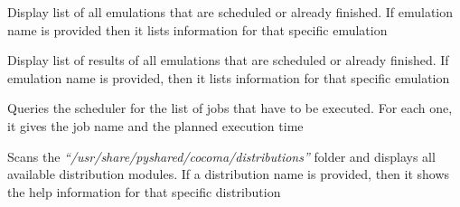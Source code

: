 \documentclass[letterpaper,10pt,english]{sphinxhowto}
\begin{document}
\begin{fulllineitems}
\label{COCOMA/02_how_to_use_it:cmdoption-ccmsh-l}
Display list of all emulations that are scheduled or already finished. If emulation name is provided then it lists information for that specific emulation

\end{fulllineitems}


\begin{fulllineitems}
\label{COCOMA/02_how_to_use_it:cmdoption-ccmsh-r}
Display list of results of all emulations that are scheduled or already finished. If emulation name is provided, then it lists information for that specific emulation

\end{fulllineitems}


\begin{fulllineitems}
\label{COCOMA/02_how_to_use_it:cmdoption-ccmsh-j}
Queries the scheduler for the list of jobs that have to be executed. For each one, it gives the job name and the planned execution time

\end{fulllineitems}


\begin{fulllineitems}
\label{COCOMA/02_how_to_use_it:cmdoption-ccmsh-i}
Scans the \emph{``/usr/share/pyshared/cocoma/distributions''} folder and displays all available distribution modules. If a distribution name is provided, then it shows the help information for that specific distribution

\end{fulllineitems}
\end{document}
